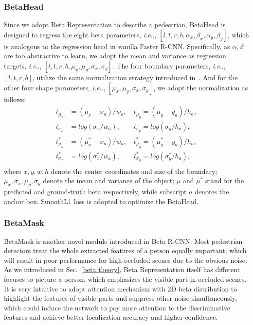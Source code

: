 \documentclass{article}
\makeatletter
\DeclareRobustCommand\onedot{\futurelet\@let@token\@onedot}
\def\@onedot{\ifx\@let@token.\else.\null\fi\xspace}
\def\ie{\emph{i.e}\onedot} \def\Ie{\emph{I.e}\onedot}
\makeatother
\begin{document}
\subsubsection{BetaHead}
Since we adopt Beta Representation to describe a pedestrian, BetaHead is designed to regress the eight beta parameters, \ie, $[l, t, r, b, \alpha_x, \beta_x, \alpha_y, \beta_y]$, which is analogous to the regression head in vanilla Faster R-CNN.
Specifically, as $\alpha, \beta$ are too abstractive to learn, we adopt the mean and variance as regression targets, \ie, $[l, t, r, b, \mu_x, \mu_y, \sigma_x, \sigma_y]$.
The four boundary parameters, \ie, $[l, t, r, b]$, utilize the same normalization strategy introduced in~\cite{faster}. 
And for the other four shape parameters, \ie, $[\mu_x, \mu_y, \sigma_x, \sigma_y]$, we adopt the normalization as follows:
\begin{equation}
    \begin{split}
        t_{\mu_x} &= (\mu_x-x_a) / w_a, \quad t_{\mu_y} = (\mu_y - y_a) / h_a, \\
        t_{\sigma_x} &= log(\sigma_x / w_a),\qquad t_{\sigma_y} = log(\sigma_y / h_a), \\
        t_{\mu_x}^* &= (\mu_x^*-x_a) / w_a,\quad t_{\mu_y}^* = (\mu_y^* - y_a) / h_a, \\
        t_{\sigma_x}^* &= log(\sigma_x^* / w_a), \qquad t_{\sigma_y}^* = log(\sigma_y^* / h_a), \\
    \end{split}
\end{equation}
where $x, y, w, h$ denote the center coordinates and size of the boundary; $\mu_x, \sigma_x, \mu_y, \sigma_y$ denote the mean and variance of the object;
$\mu$ and $\mu^*$ stand for the predicted and ground-truth beta respectively, while subscript $a$ denotes the anchor box.
SmoothL1 loss is adopted to optimize the BetaHead.

\subsubsection{BetaMask}
BetaMask is another novel module introduced in Beta R-CNN. 
Most pedestrian detectors treat the whole extracted features of a person equally important, which will result in poor performance for high-occluded scenes due to the obvious noise. 
As we introduced in Sec.~\ref{beta theory}, Beta Representation itself has different focuses to picture a person, which emphasizes the visible part in occluded scenes. It is very intuitive to adopt attention mechanism with 2D beta distribution to highlight the features of visible parts and suppress other noise simultaneously, which could induce the network to pay more attention to the discriminative features and achieve better localization accuracy and higher confidence.
\end{document}
